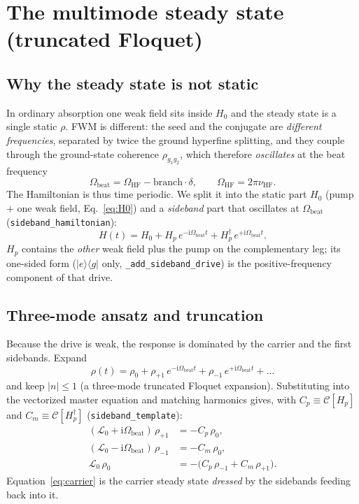 \documentclass[11pt]{article}
\newcommand{\ketbra}[2]{\lvert #1 \rangle\!\langle #2 \rvert}
\newcommand{\ii}{\mathrm{i}}
\newcommand{\HF}{\mathrm{HF}}
\newcommand{\code}[1]{\texttt{#1}}
\newcommand{\Lcal}{\mathcal{L}}
\begin{document}
\section{The multimode steady state (truncated Floquet)}
\label{sec:floquet}

\subsection{Why the steady state is not static}

In ordinary absorption one weak field sits inside $H_0$ and the steady state is a
single static $\rho$. FWM is different: the seed and the conjugate are
\emph{different frequencies}, separated by twice the ground hyperfine splitting,
and they couple through the ground-state coherence $\rho_{g_1g_2}$, which therefore
\emph{oscillates} at the beat frequency
\begin{equation}
\Omega_{\text{beat}}=\Omega_{\HF}-\text{branch}\cdot\delta,
\qquad \Omega_{\HF}=2\pi\nu_{\HF}.
\label{eq:beat}
\end{equation}
The Hamiltonian is thus time periodic. We split it into the static part
$H_0$ (pump $+$ one weak field, Eq.~\eqref{eq:H0}) and a \emph{sideband} part
that oscillates at $\Omega_{\text{beat}}$ (\code{sideband\_hamiltonian}):
\begin{equation}
H(t)=H_0+H_p\,e^{-\ii\Omega_{\text{beat}}t}+H_p^\dagger\,e^{+\ii\Omega_{\text{beat}}t}.
\label{eq:Ht}
\end{equation}
$H_p$ contains the \emph{other} weak field plus the pump on the complementary leg;
its one-sided form ($\ketbra{e}{g}$ only, \code{\_add\_sideband\_drive}) is the
positive-frequency component of that drive.

\subsection{Three-mode ansatz and truncation}

Because the drive is weak, the response is dominated by the carrier and the first
sidebands. Expand
\begin{equation}
\rho(t)=\rho_0+\rho_{+1}\,e^{-\ii\Omega_{\text{beat}}t}+\rho_{-1}\,e^{+\ii\Omega_{\text{beat}}t}+\dots
\end{equation}
and keep $|n|\le1$ (a three-mode truncated Floquet expansion). Substituting into
the vectorized master equation and matching harmonics gives, with
$C_p\equiv\mathcal{C}[H_p]$ and $C_m\equiv\mathcal{C}[H_p^\dagger]$
(\code{sideband\_template}):
\begin{align}
(\Lcal_0+\ii\Omega_{\text{beat}})\,\rho_{+1}&=-C_p\,\rho_0, \label{eq:sbplus}\\
(\Lcal_0-\ii\Omega_{\text{beat}})\,\rho_{-1}&=-C_m\,\rho_0, \label{eq:sbminus}\\
\Lcal_0\,\rho_0&=-\big(C_p\,\rho_{-1}+C_m\,\rho_{+1}\big). \label{eq:carrier}
\end{align}
Equation~\eqref{eq:carrier} is the carrier steady state \emph{dressed} by the
sidebands feeding back into it.
\end{document}
